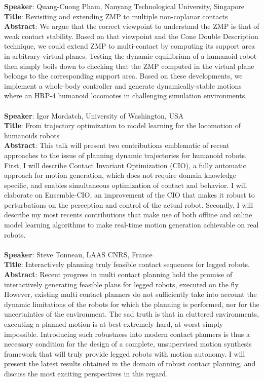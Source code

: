 \documentclass[conference]{IEEEtran}
\begin{document}
\textbf{Speaker}: Quang-Cuong Pham, Nanyang Technological University, Singapore \\
\textbf{Title}:  Revisiting and extending ZMP to multiple non-coplanar contacts \\
\textbf{Abstract}: We argue that the correct viewpoint to understand the ZMP is that of weak contact stability. Based on that viewpoint and the Cone Double Description technique, we could extend ZMP to multi-contact by computing its support area in arbitrary virtual planes. Testing the dynamic equilibrium of a humanoid robot then simply boils down to checking that the ZMP computed in the virtual plane belongs to the corresponding support area. Based on these developments, we implement a whole-body controller and generate dynamically-stable motions where an HRP-4 humanoid locomotes in challenging simulation environments.   \\ \\
\textbf{Speaker}: Igor Mordatch, University of Washington, USA \\
\textbf{Title}: From trajectory optimization to model learning for the locomotion of humanoids robots \\
\textbf{Abstract}: This talk will present two contributions emblematic of recent approaches to the issue of planning dynamic trajectories for humanoid robots.
First, I will describe Contact Invariant Optimization (CIO), a fully automatic approach for motion generation, which does not require domain knowledge speciﬁc,
and enables simultaneous optimization of contact and behavior. I will elaborate on Ensemble-CIO, an improvement of the CIO that makes it robust to  perturbations on the perception
and control of the actual robot. Secondly, I will describe my most recents contributions that make use of both offline and online model learning algorithms to make real-time motion generation
achievable on real robots.  \\ \\
\textbf{Speaker}: Steve Tonneau, LAAS CNRS, France \\
\textbf{Title}: Interactively planning truly feasible contact sequences for legged robots.\\
\textbf{Abstract}: Recent progress in multi contact planning hold the promise of interactively generating feasible plans for legged robots, executed on the fly.
However, existing multi contact planners do not sufficiently take into account the dynamic limitations of the robots for which the planning is performed, nor for the uncertainties of the environment. The sad truth is that in cluttered environments, executing a planned motion is at best extremely hard, at worst simply impossible. Introducing such
robustness into modern contact planners is thus a necessary condition for the design of a complete, unsupervised
motion synthesis framework that will truly provide legged robots with motion autonomy. I will
present the latest results obtained in the domain of robust contact planning, and discuss the most exciting perspectives
in this regard.\\ \\
\end{document}
